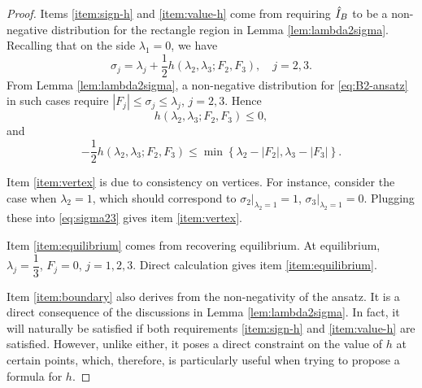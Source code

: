 \begin{proof}
  Items \ref{item:sign-h} and \ref{item:value-h} come from requiring
  $\hat I_B$ to be a non-negative distribution for the rectangle
  region in Lemma \ref{lem:lambda2sigma}.  Recalling that on the side
  $\lambda_1 = 0$, we have
  \begin{equation}\label{eq:sigma23}
    \sigma_j = \lambda_j + \frac12 h(\lambda_2,\lambda_3; F_2,F_3),
    \quad j = 2,3.
  \end{equation}
  From Lemma \ref{lem:lambda2sigma}, a non-negative distribution for
  \eqref{eq:B2-ansatz} in such cases require
  $|F_j| \leq \sigma_j \leq \lambda_j$, $j = 2,3$.  Hence
  \[
    h(\lambda_2,\lambda_3; F_2,F_3) \leq 0,
  \]
  and
  \[
    -\frac12 h(\lambda_2,\lambda_3; F_2,F_3) \leq 
    \min\left\{\lambda_2 - |F_2|, \lambda_3 - |F_3|\right\}.
  \]

  Item \ref{item:vertex} is due to consistency on vertices.  For
  instance, consider the case when $\lambda_2 = 1$, which should
  correspond to $\left.\sigma_2\right|_{\lambda_2 = 1} = 1$,
  $\left.\sigma_3\right|_{\lambda_2 = 1} = 0$. Plugging these into
  \eqref{eq:sigma23} gives item \ref{item:vertex}.

  Item \ref{item:equilibrium} comes from recovering equilibrium.  At
  equilibrium, $\lambda_j = \dfrac13$, $F_j = 0$, $j = 1,2,3$.  Direct
  calculation gives item \ref{item:equilibrium}.

  Item \ref{item:boundary} also derives from the non-negativity of
  the ansatz. It is a direct consequence of the discussions in Lemma
  \ref{lem:lambda2sigma}. In fact, it will naturally be satisfied if
  both requirements \ref{item:sign-h} and \ref{item:value-h} are
  satisfied. However, unlike either, it poses a direct constraint on the
  value of $h$ at certain points, which, therefore, is particularly
  useful when trying to propose a formula for $h$.

\end{proof}

